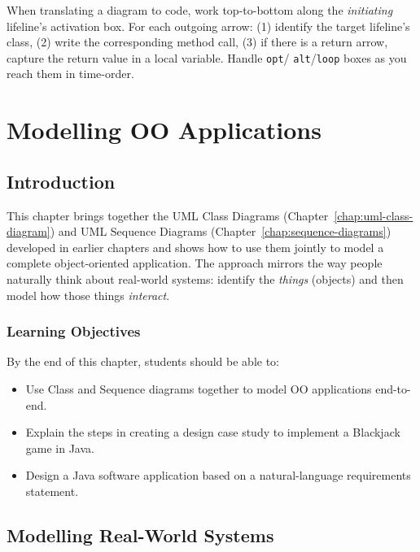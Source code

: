 \documentclass[11pt, a4paper, notitlepage]{report}
\theoremstyle{definition}
\theoremstyle{remark}
\theoremstyle{definition}
\begin{document}
\begin{examtip}[title={Exam Tip: Reading a Sequence Diagram Systematically}]
When translating a diagram to code, work top-to-bottom along the \emph{initiating}
lifeline's activation box. For each outgoing arrow: (1) identify the target
lifeline's class, (2) write the corresponding method call, (3) if there is a
return arrow, capture the return value in a local variable. Handle \texttt{opt}/
\texttt{alt}/\texttt{loop} boxes as you reach them in time-order.
\end{examtip}

\chapter{Modelling OO Applications}
\label{chap:ch8-modelling-oo-app}

\section{Introduction}
\label{sec:ch8-intro}

This chapter brings together the UML Class Diagrams (Chapter~\ref{chap:uml-class-diagram}) and
UML Sequence Diagrams (Chapter~\ref{chap:sequence-diagrams}) developed in earlier chapters and
shows how to use them jointly to model a complete object-oriented application. The approach
mirrors the way people naturally think about real-world systems: identify the \emph{things}
(objects) and then model how those things \emph{interact}.

\subsection{Learning Objectives}

By the end of this chapter, students should be able to:
\begin{itemize}
  \item Use Class and Sequence diagrams together to model OO applications end-to-end.
  \item Explain the steps in creating a design case study to implement a Blackjack game in Java.
  \item Design a Java software application based on a natural-language requirements statement.
\end{itemize}

\section{Modelling Real-World Systems}
\label{sec:ch8-real-world}
\end{document}
